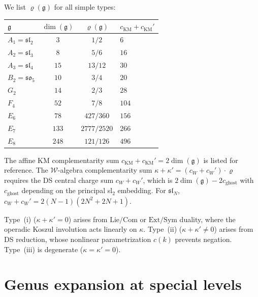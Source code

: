 \begin{computation}
\label{comp:complementarity-classical}
We list $\varrho(\mathfrak{g})$ for all simple types:
\begin{center}
\renewcommand{\arraystretch}{1.3}
\begin{tabular}{lccl}
\toprule
$\mathfrak{g}$ & $\dim(\mathfrak{g})$ & $\varrho(\mathfrak{g})$ & $c_{\mathrm{KM}} + c_{\mathrm{KM}}'$ \\
\midrule
$A_1 = \mathfrak{sl}_2$ & $3$ & $1/2$ & $6$ \\
$A_2 = \mathfrak{sl}_3$ & $8$ & $5/6$ & $16$ \\
$A_3 = \mathfrak{sl}_4$ & $15$ & $13/12$ & $30$ \\
$B_2 = \mathfrak{so}_5$ & $10$ & $3/4$ & $20$ \\
$G_2$ & $14$ & $2/3$ & $28$ \\
$F_4$ & $52$ & $7/8$ & $104$ \\
$E_6$ & $78$ & $427/360$ & $156$ \\
$E_7$ & $133$ & $2777/2520$ & $266$ \\
$E_8$ & $248$ & $121/126$ & $496$ \\
\bottomrule
\end{tabular}
\end{center}
The affine KM complementarity sum $c_{\mathrm{KM}} + c_{\mathrm{KM}}' = 2\dim(\mathfrak{g})$ is listed for reference.  The $\mathcal{W}$-algebra complementarity sum $\kappa + \kappa' = (c_W + c_W') \cdot \varrho$ requires the DS central charge sum $c_W + c_W'$, which is $2\dim(\mathfrak{g}) - 2c_{\mathrm{ghost}}$ with $c_{\mathrm{ghost}}$ depending on the principal sl$_2$ embedding.  For $\mathfrak{sl}_N$, $c_W + c_W' = 2(N-1)(2N^2+2N+1)$.
\end{computation}

\begin{remark}
\label{rem:complementarity-operadic}
Type~(i) ($\kappa + \kappa' = 0$) arises from $\mathrm{Lie}/\mathrm{Com}$ or $\mathrm{Ext}/\mathrm{Sym}$ duality, where the operadic Koszul involution acts linearly on $\kappa$.  Type~(ii) ($\kappa + \kappa' \neq 0$) arises from DS reduction, whose nonlinear parametrization $c(k)$ prevents negation.  Type~(iii) is degenerate ($\kappa = \kappa' = 0$).
\end{remark}


\section{Genus expansion at special levels}
\label{sec:special-level-genera}

